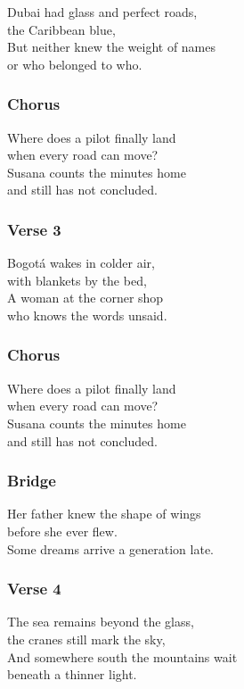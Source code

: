 Dubai had glass and perfect roads,\\
the Caribbean blue,\\
But neither knew the weight of names\\
or who belonged to who.

\subsubsection{Chorus}\label{chorus-3}

Where does a pilot finally land\\
when every road can move?\\
Susana counts the minutes home\\
and still has not concluded.

\subsubsection{Verse 3}\label{verse-3-1}

Bogotá wakes in colder air,\\
with blankets by the bed,\\
A woman at the corner shop\\
who knows the words unsaid.

\subsubsection{Chorus}\label{chorus-4}

Where does a pilot finally land\\
when every road can move?\\
Susana counts the minutes home\\
and still has not concluded.

\subsubsection{Bridge}\label{bridge-1}

Her father knew the shape of wings\\
before she ever flew.\\
Some dreams arrive a generation late.

\subsubsection{Verse 4}\label{verse-4-1}

The sea remains beyond the glass,\\
the cranes still mark the sky,\\
And somewhere south the mountains wait\\
beneath a thinner light.

